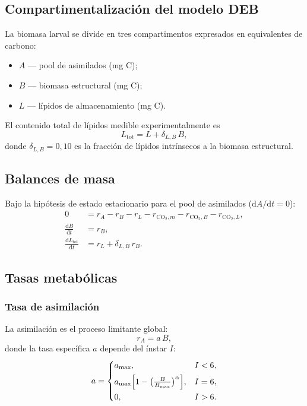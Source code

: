 
\subsection{Compartimentalización del modelo DEB}
La biomasa larval se divide en tres compartimentos expresados en equivalentes de carbono:
\begin{itemize}
    \item $A$ --- pool de asimilados (mg C);
    \item $B$ --- biomasa estructural (mg C);
    \item $L$ --- l\'{i}pidos de almacenamiento (mg C).
\end{itemize}
El contenido total de l\'{i}pidos medible experimentalmente es
\begin{equation}
    L_{\text{tot}} = L + \delta_{L,B}\,B,
\end{equation}
donde $\delta_{L,B}=0{,}10$ es la fracci\'{o}n de l\'{i}pidos intr\'{i}nsecos a la biomasa estructural.

\subsection{Balances de masa}
Bajo la hip\'{o}tesis de estado estacionario para el pool de asimilados ($\mathrm{d}A/\mathrm{d}t=0$):
\begin{align}
    0 &= r_A - r_B - r_L - r_{\mathrm{CO_2},m} - r_{\mathrm{CO_2},B} - r_{\mathrm{CO_2},L}, \\
    \frac{\mathrm{d}B}{\mathrm{d}t} &= r_B, \\
    \frac{\mathrm{d}L_{\text{tot}}}{\mathrm{d}t} &= r_L + \delta_{L,B}\,r_B.
\end{align}

\subsection{Tasas metab\'{o}licas}
\subsubsection{Tasa de asimilaci\'{o}n}
La asimilaci\'{o}n es el proceso limitante global:
\begin{equation}
    r_A = a\,B,
\end{equation}
donde la tasa espec\'{i}fica $a$ depende del \'{i}nstar $I$:
\begin{equation}
    a =
    \begin{cases}
        a_{\max}, & I < 6, \\[4pt]
        a_{\max}\Bigl[1 - \bigl(\frac{B}{B_{\max}}\bigr)^{\alpha}\Bigr], & I = 6, \\[4pt]
        0, & I > 6.
    \end{cases}
\end{equation}

